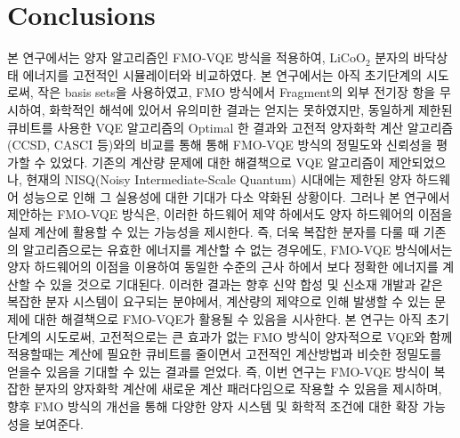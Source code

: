 \documentclass[pdflatex,sn-mathphys-num]{sn-jnl}%
\theoremstyle{thmstyleone}%
\theoremstyle{thmstyletwo}%
\theoremstyle{thmstylethree}%
\begin{document}
\section{Conclusions}
본 연구에서는 양자 알고리즘인 FMO-VQE 방식을 적용하여, \(\mathrm{LiCoO_2}\)  분자의 바닥상태 에너지를 고전적인 시뮬레이터와 비교하였다. 본 연구에서는 아직 초기단계의 시도로써, 작은 basis sets을 사용하였고, FMO 방식에서 Fragment의 외부 전기장 항을 무시하여, 화학적인 해석에 있어서 유의미한 결과는 얻지는 못하였지만, 
동일하게 제한된 큐비트를 사용한 VQE 알고리즘의 Optimal 한 결과와 고전적 양자화학 계산 알고리즘 (CCSD, CASCI 등)와의 비교를 통해 통해 FMO-VQE 방식의 정밀도와 신뢰성을 평가할 수 있었다.
기존의 계산량 문제에 대한 해결책으로 VQE 알고리즘이 제안되었으나, 현재의 NISQ(Noisy Intermediate-Scale Quantum) 시대에는 제한된 양자 하드웨어 성능으로 인해 그 실용성에 대한 기대가 다소 약화된 상황이다. 그러나 본 연구에서 제안하는 FMO-VQE 방식은, 이러한 하드웨어 제약 하에서도 양자 하드웨어의 이점을 실제 계산에 활용할 수 있는 가능성을 제시한다.
즉, 더욱 복잡한 분자를 다룰 때 기존의 알고리즘으로는 유효한 에너지를 계산할 수 없는 경우에도, FMO-VQE 방식에서는 양자 하드웨어의 이점을 이용하여 동일한 수준의 근사 하에서 보다 정확한 에너지를 계산할 수 있을 것으로 기대된다. 이러한 결과는 향후 신약 합성 및 신소재 개발과 같은 복잡한 분자 시스템이 요구되는 분야에서, 계산량의 제약으로 인해 발생할 수 있는 문제에 대한 해결책으로 FMO-VQE가 활용될 수 있음을 시사한다. 
본 연구는 아직 초기 단계의 시도로써, 고전적으로는 큰 효과가 없는 FMO 방식이 양자적으로 VQE와 함께 적용할때는 계산에 필요한 큐비트를 줄이면서 고전적인 계산방법과 비슷한 정밀도를 얻을수 있음을 기대할 수 있는 결과를 얻었다. 즉, 이번 연구는 FMO-VQE 방식이 복잡한 분자의 양자화학 계산에 새로운 계산 패러다임으로 작용할 수 있음을 제시하며, 향후 FMO 방식의 개선을 통해 다양한 양자 시스템 및 화학적 조건에 대한 확장 가능성을 보여준다.

% 

\end{document}
